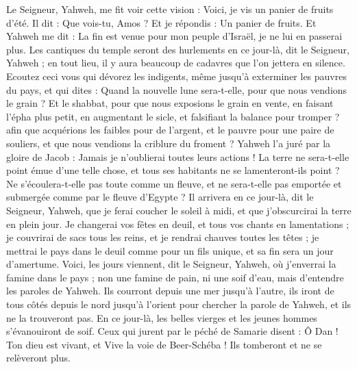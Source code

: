 \begin{multicols}{2}
\VerseOne{}Le Seigneur, Yahweh, me fit voir cette vision : Voici, je vis un panier de fruits d'été.
Il dit : Que vois-tu, Amos ? Et je répondis : Un panier de fruits. Et Yahweh me dit : La fin est venue pour mon peuple d'Israël, je ne lui en passerai plus.
Les cantiques du temple seront des hurlements en ce jour-là, dit le Seigneur, Yahweh ; en tout lieu, il y aura beaucoup de cadavres que l'on jettera en silence.
Ecoutez ceci vous qui dévorez les indigents, même jusqu'à exterminer les pauvres du pays,
et qui dites : Quand la nouvelle lune sera-t-elle, pour que nous vendions le grain ? Et le shabbat, pour que nous exposions le grain en vente, en faisant l’épha plus petit, en augmentant le sicle, et falsifiant la balance pour tromper ?
afin que acquérions les faibles pour de l'argent, et le pauvre pour une paire de souliers, et que nous vendions la criblure du froment ?
Yahweh l'a juré par la gloire de Jacob : Jamais je n'oublierai toutes leurs actions !
La terre ne sera-t-elle point émue d'une telle chose, et tous ses habitants ne se lamenteront-ils point ? Ne s'écoulera-t-elle pas toute comme un fleuve, et ne sera-t-elle pas emportée et submergée comme par le fleuve d'Egypte ? 
Il arrivera en ce jour-là, dit le Seigneur, Yahweh, que je ferai coucher le soleil à midi, et que j'obscurcirai la terre en plein jour.
Je changerai vos fêtes en deuil, et tous vos chants en lamentations ; je couvrirai de sacs tous les reins, et je rendrai chauves toutes les têtes ; je mettrai le pays dans le deuil comme pour un fils unique, et sa fin sera un jour d'amertume.
Voici, les jours viennent, dit le Seigneur, Yahweh, où j'enverrai la famine dans le pays ; non une famine de pain, ni une soif d'eau, mais d'entendre les paroles de Yahweh.
Ils courront depuis une mer jusqu'à l'autre, ils iront de tous côtés depuis le nord jusqu'à l'orient pour chercher la parole de Yahweh, et ils ne la trouveront pas.
En ce jour-là, les belles vierges et les jeunes hommes s'évanouiront de soif.
Ceux qui jurent par le péché de Samarie disent : Ô Dan ! Ton dieu est vivant, et Vive la voie de Beer-Schéba ! Ils  tomberont et ne se relèveront plus.

\end{multicols}
